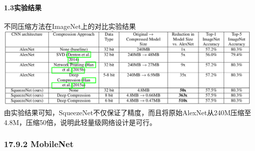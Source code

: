 \paragraph{1.3实验结果}\label{ux5b9eux9a8cux7ed3ux679c}

不同压缩方法在ImageNet上的对比实验结果
\includegraphics{./img/ch17/11.png}
由实验结果可知，SqueezeNet不仅保证了精度，而且将原始AlexNet从240M压缩至4.8M，压缩50倍，说明此轻量级网络设计是可行。

\subsubsection{17.9.2 MobileNet}\label{mobilenet}

